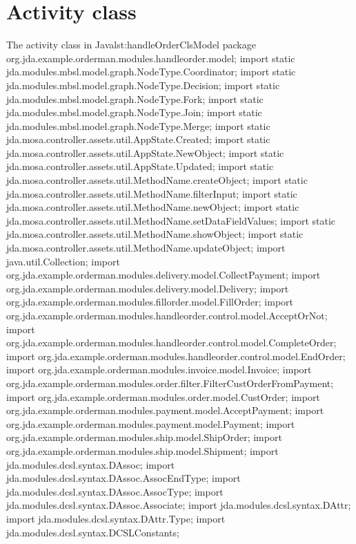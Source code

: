 \section{Activity class } 
\label{apex:agl-classOrderMan}
\begin{lstcodeplainssm}{The activity class  in Java}{lst:handleOrderClsModel}
package org.jda.example.orderman.modules.handleorder.model;
import static jda.modules.mbsl.model.graph.NodeType.Coordinator;
import static jda.modules.mbsl.model.graph.NodeType.Decision;
import static jda.modules.mbsl.model.graph.NodeType.Fork;
import static jda.modules.mbsl.model.graph.NodeType.Join;
import static jda.modules.mbsl.model.graph.NodeType.Merge;
import static jda.mosa.controller.assets.util.AppState.Created;
import static jda.mosa.controller.assets.util.AppState.NewObject;
import static jda.mosa.controller.assets.util.AppState.Updated;
import static jda.mosa.controller.assets.util.MethodName.createObject;
import static jda.mosa.controller.assets.util.MethodName.filterInput;
import static jda.mosa.controller.assets.util.MethodName.newObject;
import static jda.mosa.controller.assets.util.MethodName.setDataFieldValues;
import static jda.mosa.controller.assets.util.MethodName.showObject;
import static jda.mosa.controller.assets.util.MethodName.updateObject;
import java.util.Collection;
import org.jda.example.orderman.modules.delivery.model.CollectPayment;
import org.jda.example.orderman.modules.delivery.model.Delivery;
import org.jda.example.orderman.modules.fillorder.model.FillOrder;
import org.jda.example.orderman.modules.handleorder.control.model.AcceptOrNot;
import org.jda.example.orderman.modules.handleorder.control.model.CompleteOrder;
import org.jda.example.orderman.modules.handleorder.control.model.EndOrder;
import org.jda.example.orderman.modules.invoice.model.Invoice;
import org.jda.example.orderman.modules.order.filter.FilterCustOrderFromPayment;
import org.jda.example.orderman.modules.order.model.CustOrder;
import org.jda.example.orderman.modules.payment.model.AcceptPayment;
import org.jda.example.orderman.modules.payment.model.Payment;
import org.jda.example.orderman.modules.ship.model.ShipOrder;
import org.jda.example.orderman.modules.ship.model.Shipment;
import jda.modules.dcsl.syntax.DAssoc;
import jda.modules.dcsl.syntax.DAssoc.AssocEndType;
import jda.modules.dcsl.syntax.DAssoc.AssocType;
import jda.modules.dcsl.syntax.DAssoc.Associate;
import jda.modules.dcsl.syntax.DAttr;
import jda.modules.dcsl.syntax.DAttr.Type;
import jda.modules.dcsl.syntax.DCSLConstants;

\end{lstcodeplainssm}
